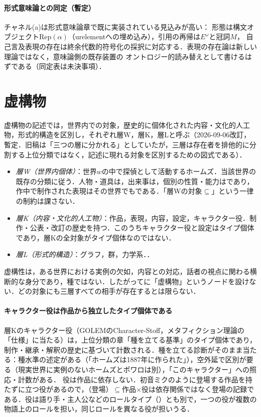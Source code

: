 \documentclass[../../main-detail.tex]{subfiles}
\begin{document}
\paragraph{形式意味論との同定（暫定）} チャネル(a)は形式意味論章で既に実装されている見込みが高い：
形態は構文オブジェクト$\mathrm{Rep}(\alpha)$（urelementへの埋め込み），引用の再帰は$E^\omega$と冠詞$M$，
自己言及表現の存在は終余代数的符号化の採択に対応する．表現の存在論は新しい理論ではなく，意味論側の既存装置の
オントロジー的読み替えとして書けるはずである（同定表は未決事項）．

\section{虚構物}\label{sec:fiction}
虚構物の記述では，世界内での対象，歴史的に個体化された内容・文化的人工物，形式的構造を区別し，それぞれ層W，層K，層Lと呼ぶ（2026-09-06改訂，暫定．旧稿は「三つの層に分かれる」としていたが，三層は存在者を排他的に分割する上位分類ではなく，記述に現れる対象を区別するための図式である）．
\begin{itemize}
    \item \emph{層W（世界内個体）}：世界$w$の中で探偵として活動するホームズ．当該世界の既存の分類に従う．人物・道具は，出来事は，個別の性質・能力はであり，作中で制作された表現はその世界でもである．「層Wの対象$\subseteq$」という一律の制約は課さない．
    \item \emph{層K（内容・文化的人工物）}：作品，表現，内容，設定，キャラクター役．制作・公表・改訂の歴史を持つ．このうちキャラクター役と設定はタイプ個体であり，層Kの全対象がタイプ個体なのではない．
    \item \emph{層L（形式的構造）}：グラフ，群，力学系．．
\end{itemize}
虚構性は，ある世界における実例の欠如，内容との対応，話者の視点に関わる横断的な身分であり，種ではない．したがってに「虚構物」というノードを設けない．どの対象にも三層すべての相手が存在するとは限らない．

\paragraph{キャラクター役は作品から独立したタイプ個体である} 層Kのキャラクター役（GOLEMのCharacter-Stoff，メタフィクション理論の「仕様」に当たる）は，上位分類の章「種を立てる基準」のタイプ個体であり，制作・継承・解釈の歴史に基づいて計数される．種を立てる診断がそのまま当たる：種水準の述定がある（「ホームズは1887年に作られた」），空外延で区別が要る（現実世界に実例のないホームズとポワロは別），「このキャラクター」への照応・計数がある．
役は作品に依存しない．初音ミクのように登場する作品を持たずに立つ役があるので，（登場）$\subseteq$作品$\times$役は依存関係ではなく登場の記録である．役は語り手・主人公などのロールタイプ（）とも別で，一つの役が複数の物語上のロールを担い，同じロールを異なる役が担いうる．
\end{document}
